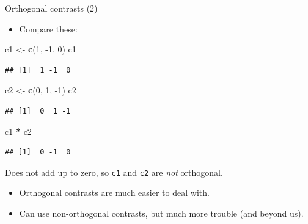 \documentclass[ignorenonframetext,]{beamer}
\newenvironment{Shaded}{\begin{snugshade}}{\end{snugshade}}
\newcommand{\DecValTok}[1]{\textcolor[rgb]{0.00,0.00,0.81}{#1}}
\newcommand{\KeywordTok}[1]{\textcolor[rgb]{0.13,0.29,0.53}{\textbf{#1}}}
\newcommand{\NormalTok}[1]{#1}
\newcommand{\OperatorTok}[1]{\textcolor[rgb]{0.81,0.36,0.00}{\textbf{#1}}}
\newcommand{\StringTok}[1]{\textcolor[rgb]{0.31,0.60,0.02}{#1}}
\providecommand{\tightlist}{%
  \setlength{\itemsep}{0pt}\setlength{\parskip}{0pt}}
\begin{document}
\begin{frame}[fragile]{Orthogonal contrasts (2)}
\protect\hypertarget{orthogonal-contrasts-2}{}

\begin{itemize}
\tightlist
\item
  Compare these:
\end{itemize}

\begin{Shaded}
\begin{Highlighting}[]
\NormalTok{c1 <-}\StringTok{ }\KeywordTok{c}\NormalTok{(}\DecValTok{1}\NormalTok{, }\DecValTok{-1}\NormalTok{, }\DecValTok{0}\NormalTok{)}
\NormalTok{c1}
\end{Highlighting}
\end{Shaded}

\begin{verbatim}
## [1]  1 -1  0
\end{verbatim}

\begin{Shaded}
\begin{Highlighting}[]
\NormalTok{c2 <-}\StringTok{ }\KeywordTok{c}\NormalTok{(}\DecValTok{0}\NormalTok{, }\DecValTok{1}\NormalTok{, }\DecValTok{-1}\NormalTok{)}
\NormalTok{c2}
\end{Highlighting}
\end{Shaded}

\begin{verbatim}
## [1]  0  1 -1
\end{verbatim}

\begin{Shaded}
\begin{Highlighting}[]
\NormalTok{c1 }\OperatorTok{*}\StringTok{ }\NormalTok{c2}
\end{Highlighting}
\end{Shaded}

\begin{verbatim}
## [1]  0 -1  0
\end{verbatim}

Does not add up to zero, so \texttt{c1} and \texttt{c2} are \emph{not}
orthogonal.

\begin{itemize}
\item
  Orthogonal contrasts are much easier to deal with.
\item
  Can use non-orthogonal contrasts, but much more trouble (and beyond
  us).
\end{itemize}

\end{frame}
\end{document}

